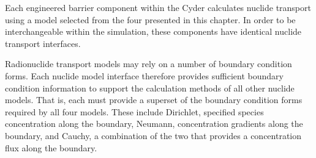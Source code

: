 Each engineered barrier component within the Cyder calculates 
nuclide transport using a model selected from the four presented in this 
chapter. In order to be interchangeable within the simulation, these components 
have identical nuclide transport interfaces.  

Radionuclide transport models may rely on a number of boundary condition forms.  
Each nuclide model interface therefore provides sufficient boundary condition 
information to support the calculation methods of all other nuclide models. That 
is, each must provide a superset of the boundary condition forms required by all 
four models. These include Dirichlet, specified species concentration along the 
boundary, Neumann, concentration gradients along the boundary, and Cauchy, a 
combination of the two that provides a concentration flux along the boundary.
